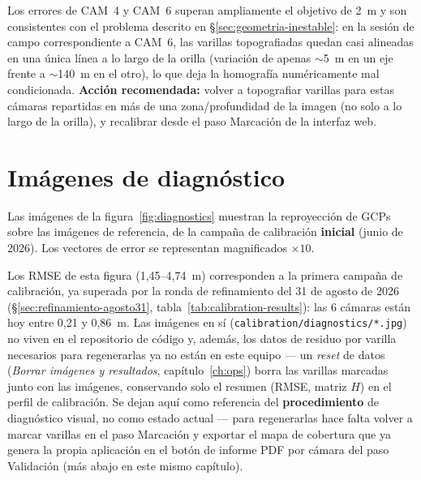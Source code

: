 \begin{warnbox}
Los errores de CAM~4 y CAM~6 superan ampliamente el objetivo de 2~m y son consistentes con el
problema descrito en \S\ref{sec:geometria-inestable}: en la sesión de campo correspondiente a
CAM~6, las varillas topografiadas quedan casi alineadas en una única línea a lo largo de la
orilla (variación de apenas $\sim$5~m en un eje frente a $\sim$140~m en el otro), lo que deja la
homografía numéricamente mal condicionada.
\textbf{Acción recomendada:} volver a topografiar varillas para estas cámaras repartidas en más
de una zona/profundidad de la imagen (no solo a lo largo de la orilla), y recalibrar desde el
paso Marcación de la interfaz web.
\end{warnbox}

\section{Imágenes de diagnóstico}

Las imágenes de la figura~\ref{fig:diagnostics} muestran la reproyección de GCPs sobre las
imágenes de referencia, de la campaña de calibración \textbf{inicial} (junio de 2026). Los
vectores de error se representan magnificados $\times10$.

\begin{warnbox}
Los RMSE de esta figura (1,45--4,74~m) corresponden a la primera campaña de calibración, ya
superada por la ronda de refinamiento del 31 de agosto de 2026
(\S\ref{sec:refinamiento-agosto31}, tabla~\ref{tab:calibration-results}): las 6 cámaras están hoy
entre 0,21 y 0,86~m. Las imágenes en sí (\texttt{calibration/diagnostics/*.jpg}) no viven en el
repositorio de código y, además, los datos de residuo por varilla necesarios para regenerarlas ya
no están en este equipo — un \textit{reset} de datos (\textit{Borrar imágenes y resultados},
capítulo~\ref{ch:ops}) borra las varillas marcadas junto con las imágenes, conservando solo el
resumen (RMSE, matriz $H$) en el perfil de calibración. Se dejan aquí como referencia del
\textbf{procedimiento} de diagnóstico visual, no como estado actual — para regenerarlas hace
falta volver a marcar varillas en el paso Marcación y exportar el mapa de cobertura que ya genera
la propia aplicación en el botón de informe PDF por cámara del paso Validación (más abajo en
este mismo capítulo).
\end{warnbox}

